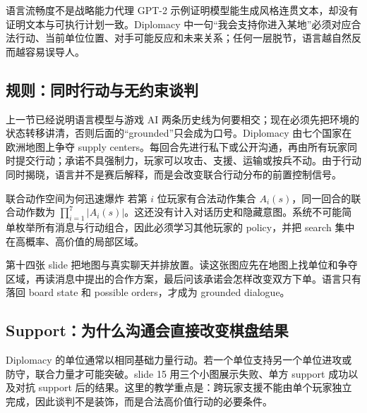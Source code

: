 \begin{warningbox}{语言流畅度不是战略能力代理}
GPT-2 示例证明模型能生成风格连贯文本，却没有证明文本与可执行计划一致。Diplomacy 中一句“我会支持你进入某地”必须对应合法行动、当前单位位置、对手可能反应和未来关系；任何一层脱节，语言越自然反而越容易误导人。
\end{warningbox}

\subsection{规则：同时行动与无约束谈判}

上一节已经说明语言模型与游戏 AI 两条历史线为何要相交；现在必须先把环境的状态转移讲清，否则后面的“grounded”只会成为口号。Diplomacy 由七个国家在欧洲地图上争夺 supply centers。每回合先进行私下或公开沟通，再由所有玩家同时提交行动；承诺不具强制力，玩家可以攻击、支援、运输或按兵不动。由于行动同时揭晓，语言并不是赛后解释，而是会改变联合行动分布的前置控制信号。



\begin{knowledgebox}{联合动作空间为何迅速爆炸}
若第 $i$ 位玩家有合法动作集合 $A_i(s)$，同一回合的联合动作数为 $\prod_{i=1}^{7}|A_i(s)|$。这还没有计入对话历史和隐藏意图。系统不可能简单枚举所有消息与行动组合，因此必须学习其他玩家的 policy，并把 search 集中在高概率、高价值的局部区域。
\end{knowledgebox}

第十四张 slide 把地图与真实聊天并排放置。读这张图应先在地图上找单位和争夺区域，再读消息中提出的合作方案，最后问该承诺会怎样改变双方下单。语言只有落回 board state 和 possible orders，才成为 grounded dialogue。


\subsection{Support：为什么沟通会直接改变棋盘结果}

Diplomacy 的单位通常以相同基础力量行动。若一个单位支持另一个单位进攻或防守，联合力量才可能突破。slide 15 用三个小图展示失败、单方 support 成功以及对抗 support 后的结果。这里的教学重点是：跨玩家支援不能由单个玩家独立完成，因此谈判不是装饰，而是合法高价值行动的必要条件。

